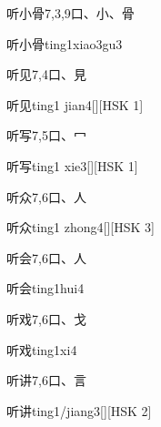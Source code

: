 \begin{Entry}{听小骨}{7,3,9}{⼝、⼩、⾻}
  \begin{Phonetics}{听小骨}{ting1xiao3gu3}
  \end{Phonetics}
\end{Entry}

\begin{Entry}{听见}{7,4}{⼝、⾒}
  \begin{Phonetics}{听见}{ting1 jian4}[][HSK 1]
  \end{Phonetics}
\end{Entry}

\begin{Entry}{听写}{7,5}{⼝、⼍}
  \begin{Phonetics}{听写}{ting1 xie3}[][HSK 1]
  \end{Phonetics}
\end{Entry}

\begin{Entry}{听众}{7,6}{⼝、⼈}
  \begin{Phonetics}{听众}{ting1 zhong4}[][HSK 3]
  \end{Phonetics}
\end{Entry}

\begin{Entry}{听会}{7,6}{⼝、⼈}
  \begin{Phonetics}{听会}{ting1hui4}
  \end{Phonetics}
\end{Entry}

\begin{Entry}{听戏}{7,6}{⼝、⼽}
  \begin{Phonetics}{听戏}{ting1xi4}
  \end{Phonetics}
\end{Entry}

\begin{Entry}{听讲}{7,6}{⼝、⾔}
  \begin{Phonetics}{听讲}{ting1/jiang3}[][HSK 2]
  \end{Phonetics}
\end{Entry}

